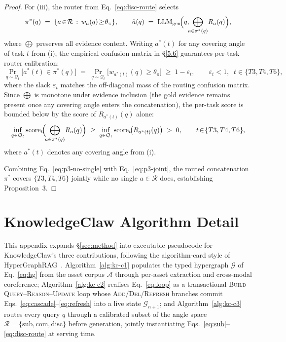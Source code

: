 \documentclass{article}
\begin{document}
\begin{proof}
For (iii), the router from Eq.~\eqref{eq:disc-route} selects
\begin{equation}
\pi^{*}(q)\;=\;\{a\!\in\!\mathcal{R}\,:\,w_a(q)\!\geq\!\theta_{\pi}\},\qquad \hat{a}(q)\;=\;\mathrm{LLM}_{\mathrm{gen}}\!\Bigl(q,\!\!\bigoplus_{a\in\pi^{*}(q)}\!R_a(q)\Bigr),
\label{eq:p3-router}
\end{equation}
where $\bigoplus$ preserves all evidence content. Writing $a^{*}(t)$ for any covering angle of task $t$ from (i), the empirical confusion matrix in \S\ref{5.6} guarantees per-task router calibration:
\begin{equation}
\Pr_{q\sim\mathcal{Q}_t}\!\bigl[a^{*}(t)\!\in\!\pi^{*}(q)\bigr]\;=\;\Pr_{q\sim\mathcal{Q}_t}\!\bigl[w_{a^{*}(t)}(q)\!\geq\!\theta_{\pi}\bigr]\;\geq\;1\!-\!\varepsilon_t,\qquad \varepsilon_t\!<\!1,\;\;t\!\in\!\{T3,T4,T6\},
\label{eq:p3-router-emp}
\end{equation}
where the slack $\varepsilon_t$ matches the off-diagonal mass of the routing confusion matrix. Since $\bigoplus$ is monotone under evidence inclusion (the gold evidence remains present once any covering angle enters the concatenation), the per-task score is bounded below by the score of $R_{a^{*}(t)}(q)$ alone:
\begin{equation}
\inf_{q\in\mathcal{Q}_t}\mathrm{score}_t\!\Bigl(\!\bigoplus_{a\in\pi^{*}(q)}\!R_a(q)\Bigr)\;\geq\;\inf_{q\in\mathcal{Q}_t}\mathrm{score}_t\!\bigl(R_{a^{*}(t)}(q)\bigr)\;>\;0,\qquad t\!\in\!\{T3,T4,T6\},
\label{eq:p3-joint}
\end{equation}
where $a^{*}(t)$ denotes any covering angle from (i).

Combining Eq.~\eqref{eq:p3-no-single} with Eq.~\eqref{eq:p3-joint}, the routed concatenation $\pi^{*}$ covers $\{T3,T4,T6\}$ jointly while no single $a\!\in\!\mathcal{R}$ does, establishing Proposition~3.
\end{proof}

\clearpage

\section{KnowledgeClaw Algorithm Detail}\label{app:algo}

This appendix expands \S\ref{sec:method} into executable pseudocode for KnowledgeClaw's three contributions, following the algorithm-card style of HyperGraphRAG~\citep{HyperGraphRAG}. Algorithm~\ref{alg:kc-c1} populates the typed hypergraph $\mathcal{G}$ of Eq.~\eqref{eq:hg} from the asset corpus $\mathcal{A}$ through per-asset extraction and cross-modal coreference; Algorithm~\ref{alg:kc-c2} realises Eq.~\eqref{eq:loop} as a transactional \textsc{Build}--\textsc{Query}--\textsc{Reason}--\textsc{Update} loop whose \textsc{Add}/\textsc{Del}/\textsc{Refresh} branches commit Eqs.~\eqref{eq:cascade}--\eqref{eq:refresh} into a live state $\mathcal{G}_{n+1}$; and Algorithm~\ref{alg:kc-c3} routes every query $q$ through a calibrated subset of the angle space $\mathcal{R}\!=\!\{\mathrm{sub},\mathrm{com},\mathrm{disc}\}$ before generation, jointly instantiating Eqs.~\eqref{eq:sub}--\eqref{eq:disc-route} at serving time.
\end{document}
